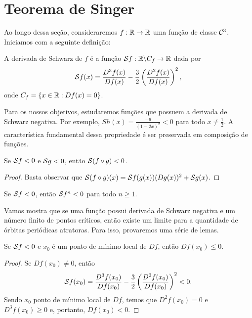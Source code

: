 \section{Teorema de Singer}

Ao longo dessa seção, consideraremos $f: \mathbb{R} \to \mathbb{R}$ uma função de classe $\mathcal{C}^3$. Iniciamos com a seguinte definição: 

\begin{definition}
A derivada de Schwarz de $f$ é a função $\mathcal{S} f: \mathbb{R} \backslash C_f \to \mathbb{R}$ dada por
$$\mathcal{S} f(x) = \frac{D^3 f(x)}{D f(x)} - \frac{3}{2} \left( \frac{D^2 f(x)}{D f(x)} \right)^2,$$
onde $C_f = \lbrace x \in \mathbb{R}: Df(x) = 0 \rbrace$.
\end{definition}

Para os nossos objetivos, estudaremos funções que possuem a derivada de Schwarz negativa. Por exemplo, $Sh(x) = \frac{-6}{(1 - 2x)^2} < 0$ para todo $x \neq \frac{1}{2}$. A característica fundamental dessa propriedade é ser preservada em composição de funções.

\begin{proposition}
Se $\mathcal{S} f < 0$ e $\mathcal{S} g < 0$, então $\mathcal{S} (f \circ g) < 0$.
\end{proposition}

\begin{proof}
Basta observar que $\mathcal{S} (f \circ g)(x) = \mathcal{S} f(g(x))(D g(x))^2 + \mathcal{S} g(x)$.
\end{proof}

\begin{corollary}
Se $\mathcal{S} f < 0$, então $\mathcal{S} f^n < 0$ para todo $n \geq 1$.
\end{corollary}

Vamos mostra que se uma função possui derivada de Schwarz negativa e um número finito de pontos críticos, então existe um limite para a quantidade de órbitas periódicas atratoras. Para isso, provaremos uma série de lemas.

\begin{lemma}\label{lem 10-1}
Se $\mathcal{S} f < 0$ e $x_0$ é um ponto de mínimo local de $D f$, então $D f(x_0) \leq 0$.
\end{lemma}

\begin{proof}
Se $D f(x_0) \neq 0$, então
$$\mathcal{S} f(x_0) = \frac{D^3 f(x_0)}{D f(x_0)} - \frac{3}{2} \left( \frac{D^2 f(x_0)}{D f(x_0)} \right)^2 < 0.$$
Sendo $x_0$ ponto de mínimo local de $D f$, temos que $D^2 f(x_0) = 0$ e $D^3 f(x_0) \geq 0$ e, portanto, $D f(x_0) < 0$. 
\end{proof}

